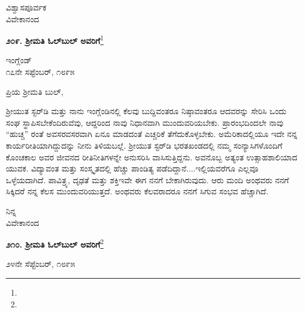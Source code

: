 \vspace{-0.3cm}

{\flushright
ವಿಶ್ವಾಸಪೂರ್ವಕ\\ವಿವೇಕಾನಂದ\par}

\vspace{-0.3cm}

\begin{center}
\textbf{೨೦೯. ಶ‍್ರೀಮತಿ ಓಲ್‌ಬುಲ್‌ ಅವರಿಗೆ}\footnote{}
\end{center}

\vspace{-0.4cm}

\begin{flushright}
ಇಂಗ್ಲೆಂಡ್\\೧೭ನೇ ಸಪ್ಟೆಂಬರ್, ೧೮೯೫
\end{flushright}

\vspace{-0.3cm}

\noindent
ಪ್ರಿಯ ಶ‍್ರೀಮತಿ ಬುಲ್,

ಶ‍್ರೀಯುತ ಸ್ಟರ್‌ಡಿ ಮತ್ತು ನಾನು ಇಂಗ್ಲೆಂಡಿನಲ್ಲಿ ಕೆಲವು ಬುದ್ದಿವಂತರೂ ನಿಷ್ಠಾವಂತರೂ ಆದವರನ್ನು ಸೇರಿಸಿ ಒಂದು ಸಂಘ ಸ್ಥಾಪಿಸಬೇಕೆಂದಿರುವೆವು, ಆದ್ದರಿಂದ ನಾವು ನಿಧಾನವಾಗಿ ಮುಂದುವರಿಯಬೇಕು. ಪ್ರಾರಂಭದಿಂದಲೇ ನಾವು ``ಹುಚ್ಚ'' ರಂತೆ ಅವಸರವಸರವಾಗಿ ಏನೂ ಮಾಡದಂತೆ ಎಚ್ಚರಿಕೆ ತೆಗೆದುಕೊಳ್ಳಬೇಕು. ಅಮೆರಿಕಾದಲ್ಲಿಯೂ ಇದೇ ನನ್ನ ಕಾರ್ಯರೀತಿಯಾಗಿದ್ದುದನ್ನು ನೀನು ತಿಳಿಯಬಲ್ಲೆ. ಶ‍್ರೀಯುತ ಸ್ಟರ್‌ಡಿ ಭರತಖಂಡದಲ್ಲಿ ನಮ್ಮ ಸಂನ್ಯಾಸಿಗಳೊಂದಿಗೆ ಕೊಂಚಕಾಲ ಅವರ ಜೀವನದ ರೀತಿನೀತಿಗಳನ್ನೇ ಅನುಸರಿಸಿ ವಾಸಿಸುತ್ತಿದ್ದನು. ಅವನೊಬ್ಬ ಅತ್ಯಂತ ಉತ್ಸಾಹಶಾಲಿಯಾದ ಯುವಕ. ವಿದ್ಯಾವಂತ ಮತ್ತು ಸಂಸ್ಕೃತದಲ್ಲಿ ಹೆಚ್ಚು ಪಾಂಡಿತ್ಯ ಪಡೆದಿದ್ದಾನೆ....ಇಲ್ಲಿಯವರೆಗೂ ಎಲ್ಲವೂ ಒಳ್ಳೆಯದಾಗಿದೆ. ಪಾವಿತ್ರ್ಯ, ದೃಢತೆ ಮತ್ತು ಶಕ್ತಿ\enginline{-}ಇವೇ ಈಗ ನನಗೆ ಬೇಕಾಗಿರುವುದು. ಆರು ಮಂದಿ ಅಂಥವರು ನನಗೆ ಸಿಕ್ಕಿದರೆ ನನ್ನ ಕೆಲಸ ಮುಂದುವರಿಯುತ್ತದೆ. ಅಂಥವರು ಕೆಲವರಾದರೂ ನನಗೆ ಸಿಗುವ ಸಂಭವ ಹೆಚ್ಚಾಗಿದೆ.


{\flushright
ನಿನ್ನ\\ವಿವೇಕಾನಂದ\par}

\begin{center}
\textbf{೨೧೦. ಶ‍್ರೀಮತಿ ಓಲ್‌ಬುಲ್‌ ಅವರಿಗೆ}\footnote{}
\end{center}

\vspace{-0.7cm}

\begin{flushright}
೨೪ನೇ ಸೆಪ್ಟೆಂಬರ್, ೧೮೯೫
\end{flushright}

